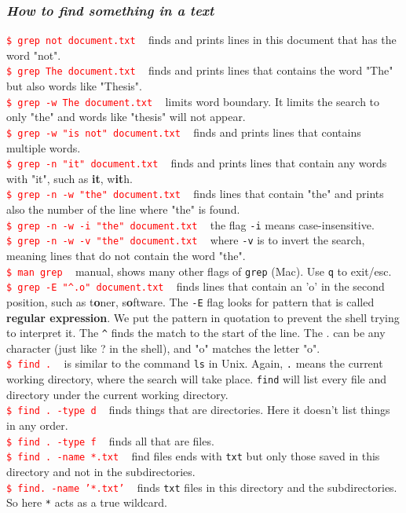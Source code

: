 \documentclass{article}
\begin{document}
{\subsubsection{\small\textsl{How to find something in a text }}
\textcolor{red}{\texttt{\$ grep not document.txt}} ~ finds and prints lines in this document that has the word "not".\\
\textcolor{red}{\texttt{\$ grep The document.txt}} ~ finds and prints lines that contains the word "The" but also words like "Thesis".\\
\textcolor{red}{\texttt{\$ grep -w The document.txt}} ~ limits word boundary. It limits the search to only "the" and words like "thesis" will not appear.\\ 
\textcolor{red}{\texttt{\$ grep -w "is not" document.txt}} ~ finds and prints lines that contains multiple words. \\
\textcolor{red}{\texttt{\$ grep -n "it" document.txt}} ~ finds and prints lines that contain any words with "it", such as \textbf{it}, w\textbf{it}h.\\
\textcolor{red}{\texttt{\$ grep -n -w "the" document.txt}}  ~ finds lines that contain "the" and prints also the number of the line where "the" is found.\\
\textcolor{red}{\texttt{\$ grep -n -w -i "the" document.txt}} ~ the flag \texttt{-i} means case-insensitive.\\
\textcolor{red}{\texttt{\$ grep -n -w -v "the" document.txt}} ~ where \texttt{-v} is to invert the search, meaning lines that do not contain the word "the".\\
\textcolor{red}{\texttt{\$ man grep}} ~ manual, shows many other flags of \texttt{grep} (Mac). Use \texttt{q} to exit/esc.\\ 
\textcolor{red}{\texttt{\$ grep -E "\textasciicircum.o" document.txt}} ~ finds lines that contain an 'o' in the second position, such as t\textbf{o}ner, s\textbf{o}ftware. The \texttt{-E} flag looks for pattern that is called \textbf{regular expression}. We put the pattern in quotation to prevent the shell trying to interpret it. The \texttt{\textasciicircum} finds the match to the start of the line. The . can be any character (just like ? in the shell), and "o" matches the letter "o". \\
\textcolor{red}{\texttt{\$ find .}} ~ is similar to the command \texttt{ls} in Unix. Again, \texttt{.} means the current working directory, where the search will take place. \texttt{find} will list every file and directory under the current working directory.\\
\textcolor{red}{\texttt{\$ find . -type d}} ~ finds things that are directories. Here it doesn't list things in any order.\\
\textcolor{red}{\texttt{\$ find . -type f}} ~ finds all that are files.\\
\textcolor{red}{\texttt{\$ find . -name *.txt}} ~ find files ends with \texttt{txt} but only those saved in this directory and not in the subdirectories. \\
\textcolor{red}{\texttt{\$ find. -name '*.txt'}} ~ finds \texttt{txt} files in this directory and the subdirectories. So here \texttt{*} acts as a true wildcard.\\
 
}
\end{document}
